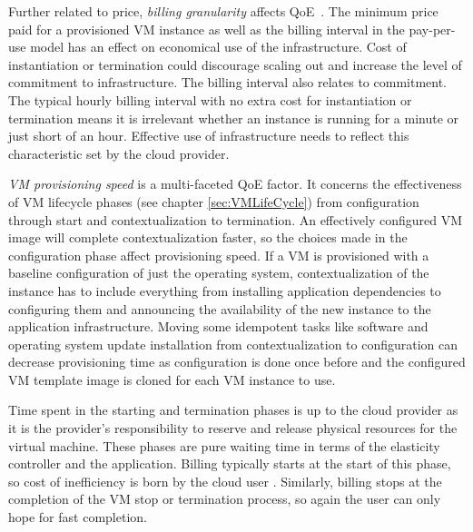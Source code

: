 \documentclass[english]{tktltiki2}
\theoremstyle{definition}
\theoremstyle{remark}
\begin{document}
Further related to price, \textit{billing granularity} affects
QoE~\cite{Brebner2012a}\cite{Islam2012}\cite{Mao2011}\cite{VandenBossche2010}.
The minimum price paid for a provisioned VM instance as well as the billing
interval in the pay-per-use model has an effect on economical use of the
infrastructure. Cost of instantiation or termination could discourage scaling
out and increase the level of commitment to infrastructure. The billing interval
also relates to commitment. The typical hourly billing interval with no extra
cost for instantiation or termination means it is irrelevant whether an instance
is running for a minute or just short of an hour. Effective use of
infrastructure needs to reflect this characteristic set by the cloud provider.

\textit{VM provisioning speed} is a multi-faceted QoE factor. It concerns the
effectiveness of VM lifecycle phases (see chapter \ref{sec:VMLifeCycle}) from
configuration through start and contextualization to termination. An effectively
configured VM image will complete contextualization faster, so the choices made
in the configuration phase affect provisioning speed. If a VM is provisioned
with a baseline configuration of just the operating system, contextualization of
the instance has to include everything from installing application dependencies
to configuring them and announcing the availability of the new instance to the
application infrastructure. Moving some idempotent tasks like software and
operating system update installation from contextualization to configuration can
decrease provisioning time as configuration is done once before and the
configured VM template image is cloned for each VM instance to use.

Time spent in the starting and termination phases is up to the cloud provider as
it is the provider's responsibility to reserve and release physical resources
for the virtual machine. These phases are pure waiting time in terms of the
elasticity controller and the application. Billing typically starts at the start
of this phase, so cost of inefficiency is born by the cloud user . Similarly,
billing stops at the completion of the VM stop or termination process, so again
the user can only hope for fast completion.
\end{document}
